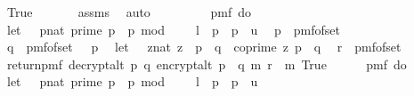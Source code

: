 \begin{isabellebody}
\ \ True{\isachardoublequoteclose}\ \isanewline
\ \ \ \ \isamarkupfalse%
\ assms{\isacharparenleft}{\kern0pt}{}{\isacharparenright}{\kern0pt}\ \isamarkupfalse%
\ auto\isanewline
\isanewline
\ \ \isamarkupfalse%
\ \isamarkupfalse%
\ \ {\isachardoublequoteopen}\isanewline
\ \ pmf\ {\isacharparenleft}{\kern0pt}do\ {\isacharbraceleft}{\kern0pt}\isanewline
\ \ let\ {\isasymK}\ {\isacharequal}{\kern0pt}\ {\isacharbraceleft}{\kern0pt}{\isacharparenleft}{\kern0pt}p{\isacharcolon}{\kern0pt}{\isacharcolon}{\kern0pt}nat{\isacharparenright}{\kern0pt}{\isachardot}{\kern0pt}\ prime\ p\ {\isasymand}\ p\ mod\ {}\ {\isacharequal}{\kern0pt}\ {}\ {\isasymand}\ l\ {\isasymle}\ p\ {\isasymand}\ p\ {\isasymle}\ u{\isacharbraceright}{\kern0pt}{\isacharsemicolon}{\kern0pt}\isanewline
\ \ p\ {\isasymleftarrow}\ pmf{\isacharunderscore}{\kern0pt}of{\isacharunderscore}{\kern0pt}set\ {\isasymK}{\isacharsemicolon}{\kern0pt}\ \isanewline
\ \ q\ {\isasymleftarrow}\ pmf{\isacharunderscore}{\kern0pt}of{\isacharunderscore}{\kern0pt}set\ {\isacharparenleft}{\kern0pt}{\isasymK}\ {\isacharminus}{\kern0pt}\ {\isacharbraceleft}{\kern0pt}p{\isacharbraceright}{\kern0pt}{\isacharparenright}{\kern0pt}{\isacharsemicolon}{\kern0pt}\isanewline
\ \ let\ {\isasymZ}\ {\isacharequal}{\kern0pt}\ {\isacharbraceleft}{\kern0pt}{\isacharparenleft}{\kern0pt}z{\isacharcolon}{\kern0pt}{\isacharcolon}{\kern0pt}nat{\isacharparenright}{\kern0pt}{\isachardot}{\kern0pt}\ z\ {\isacharless}{\kern0pt}\ p\ {\isacharasterisk}{\kern0pt}\ q\ {\isasymand}\ coprime\ z\ {\isacharparenleft}{\kern0pt}p\ {\isacharasterisk}{\kern0pt}\ q{\isacharparenright}{\kern0pt}{\isacharbraceright}{\kern0pt}{\isacharsemicolon}{\kern0pt}\isanewline
\ \ r\ {\isasymleftarrow}\ pmf{\isacharunderscore}{\kern0pt}of{\isacharunderscore}{\kern0pt}set\ {\isasymZ}{\isacharsemicolon}{\kern0pt}\isanewline
\ \ return{\isacharunderscore}{\kern0pt}pmf\ {\isacharparenleft}{\kern0pt}decrypt{\isacharunderscore}{\kern0pt}alt\ p\ q\ {\isacharparenleft}{\kern0pt}encrypt{\isacharunderscore}{\kern0pt}alt\ {\isacharparenleft}{\kern0pt}p\ {\isacharasterisk}{\kern0pt}\ q{\isacharparenright}{\kern0pt}\ m\ r{\isacharparenright}{\kern0pt}\ {\isacharequal}{\kern0pt}\ m{\isacharparenright}{\kern0pt}{\isacharbraceright}{\kern0pt}{\isacharparenright}{\kern0pt}\ True\isanewline
\ \ {\isacharequal}{\kern0pt}\ \isanewline
\ \ pmf\ {\isacharparenleft}{\kern0pt}do\ {\isacharbraceleft}{\kern0pt}\isanewline
\ \ let\ {\isasymK}\ {\isacharequal}{\kern0pt}\ {\isacharbraceleft}{\kern0pt}{\isacharparenleft}{\kern0pt}p{\isacharcolon}{\kern0pt}{\isacharcolon}{\kern0pt}nat{\isacharparenright}{\kern0pt}{\isachardot}{\kern0pt}\ prime\ p\ {\isasymand}\ p\ mod\ {}\ {\isacharequal}{\kern0pt}\ {}\ {\isasymand}\ l\ {\isasymle}\ p\ {\isasymand}\ p\ {\isasymle}\ u{\isacharbraceright}{\kern0pt}{\isacharsemicolon}{\kern0pt}\isanewline

\end{isabellebody}
